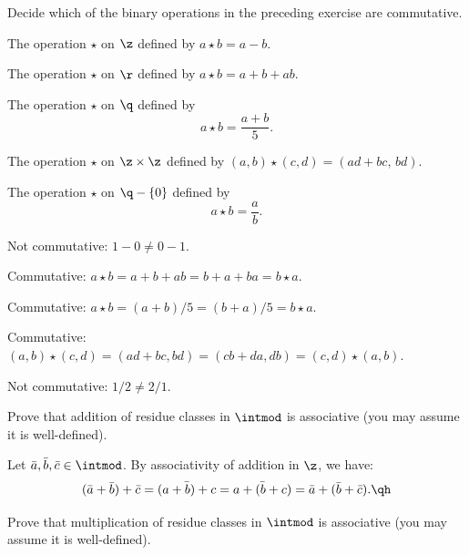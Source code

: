 \begin{exercise}\label{ex1.1.2}
    Decide which of the binary operations in the preceding exercise are commutative.
    \begin{subproblems}
        \item The operation $\star$ on $\z$ defined by $a \star b = a - b$.
        \item The operation $\star$ on $\r$ defined by $a \star b = a + b + ab$.
        \item The operation $\star$ on $\q$ defined by
        \[a \star b = \dfrac{a + b}{5}.\]
        \item The operation $\star$ on $\z \times \z$ defined by $(a,b) \star (c,d) = (ad + bc, \, bd)$.
        \item The operation $\star$ on $\q - \{0\}$ defined by
        \[a \star b = \dfrac{a}{b}.\]
    \end{subproblems}
\end{exercise}

\begin{solalph}
    \item Not commutative: $1 - 0 \neq 0 - 1$.
    \item Commutative: $a \star b = a + b + ab = b + a + ba = b \star a$.
    \item Commutative: $a \star b = (a + b)/5 = (b + a)/5 = b \star a$.
    \item Commutative: $(a, b) \star (c, d) = (ad + bc, bd) = (cb + da, db) = (c, d) \star (a, b)$.
    \item Not commutative: $1/2 \neq 2/1$.
\end{solalph}

\begin{exercise}\label{ex1.1.3}
    Prove that addition of residue classes in $\intmod$ is associative (you may assume it is well-defined).
\end{exercise}

\begin{sol}
    Let $\bar a, \bar b, \bar c \in \intmod$. By associativity of addition in $\z$, we have:
    \[(\bar a + \bar b) + \bar c = \bar{(a + b) + c} = \bar{a + (b + c)} = \bar a + (\bar b + \bar c).\qh\]
\end{sol}

\begin{exercise}\label{ex1.1.4}
    Prove that multiplication of residue classes in $\intmod$ is associative (you may assume it is well-defined).
\end{exercise}

